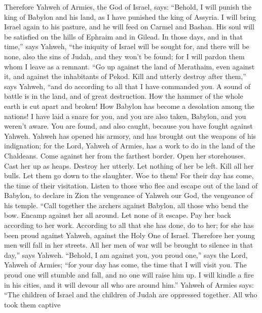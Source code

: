  Therefore Yahweh of Armies, the God of Israel, says:
``Behold, I will punish the king of Babylon and his land, as I have
punished the king of Assyria.  I will bring Israel again to
his pasture, and he will feed on Carmel and Bashan. His soul will be
satisfied on the hills of Ephraim and in Gilead.  In those
days, and in that time,'' says Yahweh, ``the iniquity of Israel will be
sought for, and there will be none, also the sins of Judah, and they
won't be found; for I will pardon them whom I leave as a remnant.
 ``Go up against the land of Merathaim, even against it,
and against the inhabitants of Pekod. Kill and utterly destroy after
them,'' says Yahweh, ``and do according to all that I have commanded
you.  A sound of battle is in the land, and of great
destruction.  How the hammer of the whole earth is cut
apart and broken! How Babylon has become a desolation among the nations!
 I have laid a snare for you, and you are also taken,
Babylon, and you weren't aware. You are found, and also caught, because
you have fought against Yahweh.  Yahweh has opened his
armory, and has brought out the weapons of his indignation; for the
Lord, Yahweh of Armies, has a work to do in the land of the Chaldeans.
 Come against her from the farthest border. Open her
storehouses. Cast her up as heaps. Destroy her utterly. Let nothing of
her be left.  Kill all her bulls. Let them go down to the
slaughter. Woe to them! For their day has come, the time of their
visitation.  Listen to those who flee and escape out of the
land of Babylon, to declare in Zion the vengeance of Yahweh our God, the
vengeance of his temple.  ``Call together the archers
against Babylon, all those who bend the bow. Encamp against her all
around. Let none of it escape. Pay her back according to her work.
According to all that she has done, do to her; for she has been proud
against Yahweh, against the Holy One of Israel.  Therefore
her young men will fall in her streets. All her men of war will be
brought to silence in that day,'' says Yahweh.  ``Behold, I
am against you, you proud one,'' says the Lord, Yahweh of Armies; ``for
your day has come, the time that I will visit you.  The
proud one will stumble and fall, and no one will raise him up. I will
kindle a fire in his cities, and it will devour all who are around
him.''  Yahweh of Armies says: ``The children of Israel and
the children of Judah are oppressed together. All who took them captive
